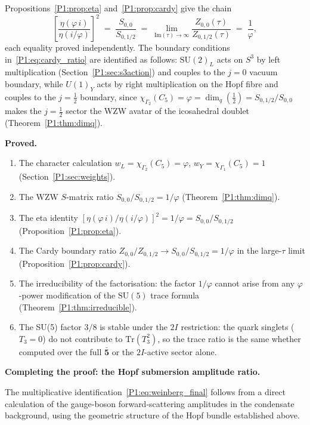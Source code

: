 \documentclass[11pt,a4paper]{article}
\theoremstyle{definition}
\theoremstyle{remark}
\newcommand{\vp}{\varphi}
\begin{document}
    \noindent Propositions~\ref{P1:prop:eta} and~\ref{P1:prop:cardy} give
    the chain
    \begin{equation}
      \left[\frac{\eta(\vp\,i)}{\eta(i/\vp)}\right]^{\!2}
      \;=\;
      \frac{S_{0,0}}{S_{0,1/2}}
      \;=\;
      \lim_{\mathrm{Im}(\tau)\to\infty}\frac{Z_{0,0}(\tau)}{Z_{0,1/2}(\tau)}
      \;=\; \frac{1}{\vp},
      \label{P1:eq:routeC_chain}
    \end{equation}
    each equality proved independently.
    The boundary conditions in~\eqref{P1:eq:cardy_ratio} are
    identified as follows: $\mathrm{SU}(2)_L$ acts on $S^3$ by
    left multiplication (Section~\ref{P1:sec:s3action}) and couples to
    the $j=0$ vacuum boundary, while $U(1)_Y$ acts by right
    multiplication on the Hopf fibre and couples to the $j=\tfrac{1}{2}$
    boundary, since $\chi_{\Gamma_2}(C_5)=\vp=\dim_q(\tfrac{1}{2})
    =S_{0,1/2}/S_{0,0}$ makes the $j=\tfrac{1}{2}$ sector
    the WZW avatar of the icosahedral doublet (Theorem~\ref{P1:thm:dimq}).

\textbf{Proved.}
\begin{enumerate}[noitemsep]
  \item The character calculation $w_L=\chi_{\Gamma_2}(C_5)=\vp$,
    $w_Y=\chi_{\Gamma_1}(C_5)=1$ (Section~\ref{P1:sec:weights}).
  \item The WZW $S$-matrix ratio $S_{0,0}/S_{0,1/2}=1/\vp$
    (Theorem~\ref{P1:thm:dimq}).
  \item The eta identity $[\eta(\vp\,i)/\eta(i/\vp)]^2 = 1/\vp =
    S_{0,0}/S_{0,1/2}$ (Proposition~\ref{P1:prop:eta}).
  \item The Cardy boundary ratio $Z_{0,0}/Z_{0,1/2}\to S_{0,0}/S_{0,1/2}
    =1/\vp$ in the large-$\tau$ limit (Proposition~\ref{P1:prop:cardy}).
  \item The irreducibility of the factorisation: the factor $1/\vp$
    cannot arise from any $\vp$-power modification of the $\mathrm{SU}(5)$
    trace formula (Theorem~\ref{P1:thm:irreducible}).
  \item The SU(5) factor $3/8$ is stable under the $2I$ restriction:
    the quark singlets ($T_3=0$) do not contribute to $\mathrm{Tr}(T_3^2)$,
    so the trace ratio is the same whether computed over the full
    $\bar{\mathbf{5}}$ or the $2I$-active sector alone.
\end{enumerate}

\textbf{Completing the proof: the Hopf submersion amplitude ratio.}

The multiplicative identification~\eqref{P1:eq:weinberg_final}
follows from a direct calculation of the gauge-boson forward-scattering
amplitudes in the condensate background, using the geometric structure
of the Hopf bundle established above.
\end{document}
